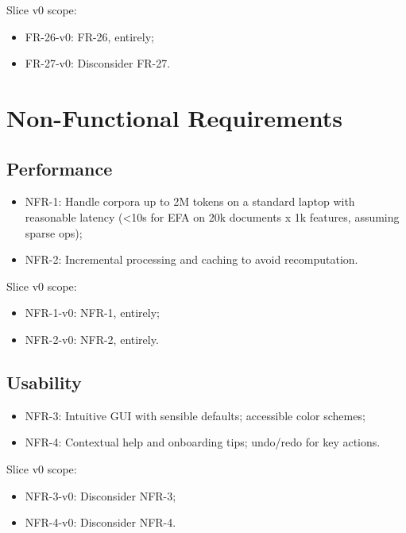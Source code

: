 Slice v0 scope:

\begin{itemize}
    \item FR-26-v0: FR-26, entirely;
    \item FR-27-v0: Disconsider FR-27.
\end{itemize}

\section{Non-Functional Requirements}

\subsection{Performance}

\begin{itemize}
    \item NFR-1: Handle corpora up to 2M tokens on a standard laptop with reasonable latency (\textless 10s for EFA on 20k documents x 1k features, assuming sparse ops);
    \item NFR-2: Incremental processing and caching to avoid recomputation.
\end{itemize}

Slice v0 scope:

\begin{itemize}
    \item NFR-1-v0: NFR-1, entirely;
    \item NFR-2-v0: NFR-2, entirely.
\end{itemize}

\subsection{Usability}

\begin{itemize}
    \item NFR-3: Intuitive GUI with sensible defaults; accessible color schemes;
    \item NFR-4: Contextual help and onboarding tips; undo/redo for key actions.
\end{itemize}

Slice v0 scope:

\begin{itemize}
    \item NFR-3-v0: Disconsider NFR-3;
    \item NFR-4-v0: Disconsider NFR-4.
\end{itemize}

